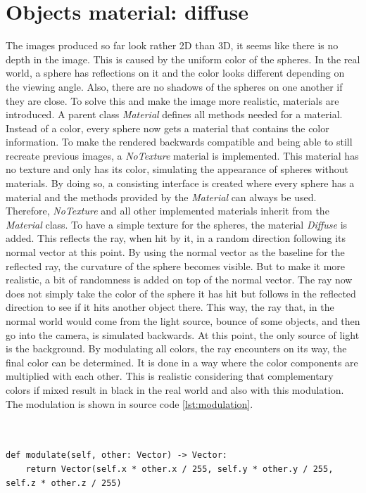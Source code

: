 \documentclass[12pt]{report}
\begin{document}
\chapter{Objects material: diffuse}
The images produced so far look rather 2D than 3D, it seems like there is no depth in the image. This is caused by the uniform color of the spheres. In the real world, a sphere has reflections on it and the color looks different depending on the viewing angle. Also, there are no shadows of the spheres on one another if they are close. To solve this and make the image more realistic, materials are introduced. A parent class \textit{Material} defines all methods needed for a material. Instead of a color, every sphere now gets a material that contains the color information. To make the rendered backwards compatible and being able to still recreate previous images, a \textit{NoTexture} material is implemented. This material has no texture and only has its color, simulating the appearance of spheres without materials. By doing so, a consisting interface is created where every sphere has a material and the methods provided by the \textit{Material} can always be used. Therefore, \textit{NoTexture} and all other implemented materials inherit from the \textit{Material} class. To have a simple texture for the spheres, the material \textit{Diffuse} is added. This reflects the ray, when hit by it, in a random direction following its normal vector at this point. By using the normal vector as the baseline for the reflected ray, the curvature of the sphere becomes visible. But to make it more realistic, a bit of randomness is added on top of the normal vector. The ray now does not simply take the color of the sphere it has hit but follows in the reflected direction to see if it hits another object there. This way, the ray that, in the normal world would come from the light source, bounce of some objects, and then go into the camera, is simulated backwards. At this point, the only source of light is the background. By modulating all colors, the ray encounters on its way, the final color can be determined. It is done in a way where the color components are multiplied with each other. This is realistic considering that complementary colors if mixed result in black in the real world and also with this modulation. The modulation is shown in source code \ref{lst:modulation}. \\\\\\
\begin{lstlisting}[caption={Modulating two colors}, label=lst:modulation, style=mystyle]
def modulate(self, other: Vector) -> Vector:
    return Vector(self.x * other.x / 255, self.y * other.y / 255, self.z * other.z / 255)
\end{lstlisting}
\end{document}
